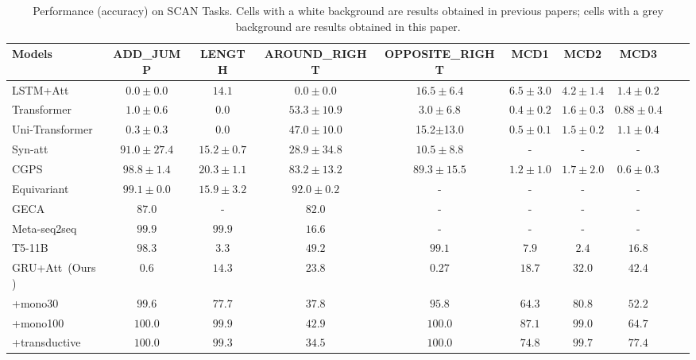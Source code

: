 \documentclass[letterpaper]{article} %
\begin{document}
\begin{table}[htbp]
\small
\caption{Performance (accuracy) on SCAN Tasks. Cells with a white background are results obtained in previous papers; cells with a grey background are results obtained in this paper.}
\centering
\begin{tabular}{lccccccccc}
\toprule[1pt]
 Models  & ADD\_JUMP & LENGTH  &AROUND\_RIGHT& OPPOSITE\_RIGHT & MCD1 & MCD2 & MCD3\\
\midrule
LSTM+Att &$0.0\pm0.0$&$14.1$ & $0.0\pm0.0$ & $16.5\pm6.4$ &$6.5\pm3.0$ & $4.2\pm1.4$& $1.4\pm0.2$\\
Transformer &$1.0\pm0.6$& $0.0$& $53.3\pm10.9$ & $3.0\pm6.8$ & $0.4\pm0.2$ & $1.6\pm0.3$&$0.88\pm0.4$\\
Uni-Transformer& $0.3\pm0.3$ & $0.0$ & $47.0 \pm10.0$ &15.2$\pm$13.0& $0.5\pm0.1$ & $1.5\pm0.2$&$1.1\pm0.4$\\
\midrule
Syn-att&$91.0\pm27.4$&$15.2\pm0.7$&$28.9\pm34.8$&$10.5\pm8.8$&-&-&-\\
CGPS&$98.8\pm1.4$& $20.3\pm1.1$ &$83.2\pm13.2$ &$89.3\pm15.5$ &$1.2\pm1.0$ & $1.7\pm2.0$& $0.6\pm0.3$ \\
Equivariant&$99.1\pm0.0$&$15.9\pm3.2$&$\mathbf{92.0\pm0.2}$&-&-&-&-\\
GECA & $87.0$ &- & $82.0$&- &-&-&-\\
Meta-seq2seq&$99.9$&$99.9$&$16.6$&-&-&-&-\\
T5-11B&$98.3$&$3.3$&$49.2$&$\mathbf{99.1}$ &$7.9$&$2.4$ &$16.8$ \\
\midrule[1pt]
 GRU+Att~(Ours) & \cellcolor{lightgray}$0.6$ &\cellcolor{lightgray}$14.3$&\cellcolor{lightgray} $23.8$ & \cellcolor{lightgray}$0.27$  &\cellcolor{lightgray} $18.7$ &\cellcolor{lightgray}$32.0$& \cellcolor{lightgray}$42.4$ \\
\quad +mono30&\cellcolor{lightgray}$\mathbf{99.6}$&\cellcolor{lightgray}$\mathbf{77.7}$&\cellcolor{lightgray}$37.8$&\cellcolor{lightgray}$95.8$ &\cellcolor{lightgray} $\mathbf{64.3}$&\cellcolor{lightgray}$\mathbf{80.8}$&\cellcolor{lightgray}$\mathbf{52.2}$ \\
\midrule
\quad +mono100&\cellcolor{lightgray}$100.0$&\cellcolor{lightgray}$99.9$&\cellcolor{lightgray}$42.9$&\cellcolor{lightgray}$100.0$&\cellcolor{lightgray}$87.1$&\cellcolor{lightgray}$99.0$&\cellcolor{lightgray}$64.7$\\
\quad +transductive&\cellcolor{lightgray}$100.0$&\cellcolor{lightgray}$99.3$&\cellcolor{lightgray}$34.5$&\cellcolor{lightgray}$100.0$&\cellcolor{lightgray}$74.8$ &\cellcolor{lightgray}$99.7$ &\cellcolor{lightgray}$77.4$  \\
\bottomrule[1pt]
\end{tabular}
\label{tab:scan}
\end{table}
\end{document}
